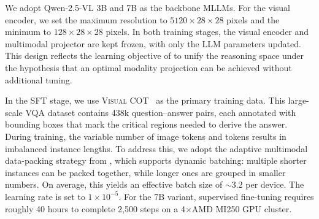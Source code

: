 We adopt Qwen-2.5-VL 3B and 7B as the backbone MLLMs. For the visual encoder, we set the maximum resolution to $5120 \times 28 \times 28$ pixels and the minimum to $128 \times 28 \times 28$ pixels. In both training stages, the visual encoder and multimodal projector are kept frozen, with only the LLM parameters updated. This design reflects the learning objective of \modelname to unify the reasoning space under the hypothesis that an optimal modality projection can be achieved without additional tuning.



In the SFT stage, we use \textsc{Visual COT}~\citep{visualcot} as the primary training data. This large-scale VQA dataset contains 438k question–answer pairs, each annotated with bounding boxes that mark the critical regions needed to derive the answer. During training, the variable number of image tokens and \modelname tokens results in imbalanced instance lengths. To address this, we adopt the adaptive multimodal data-packing strategy from \citet{internvl2.5}, which supports dynamic batching: multiple shorter instances can be packed together, while longer ones are grouped in smaller numbers. On average, this yields an effective batch size of $\sim$3.2 per device. The learning rate is set to $1\times 10^{-5}$. For the 7B variant, supervised fine-tuning requires roughly 40 hours to complete 2,500 steps on a 4$\times$AMD MI250 GPU cluster.


